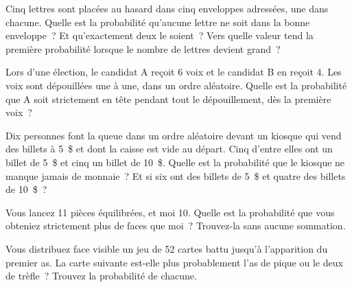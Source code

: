 \begin{question}\label{iq:iv1:counting-and-symmetry:12}
Cinq lettres sont placées au hasard dans cinq enveloppes adressées, une dans chacune. Quelle est la probabilité qu'aucune lettre ne soit dans la bonne enveloppe~? Et qu'exactement deux le soient~? Vers quelle valeur tend la première probabilité lorsque le nombre de lettres devient grand~?
\end{question}

\begin{question}\label{iq:iv1:counting-and-symmetry:13}
Lors d'une élection, le candidat A reçoit 6 voix et le candidat B en reçoit 4. Les voix sont dépouillées une à une, dans un ordre aléatoire. Quelle est la probabilité que A soit strictement en tête pendant tout le dépouillement, dès la première voix~?
\end{question}

\begin{question}\label{iq:iv1:counting-and-symmetry:14}
Dix personnes font la queue dans un ordre aléatoire devant un kiosque qui vend des billets à 5~\$ et dont la caisse est vide au départ. Cinq d'entre elles ont un billet de 5~\$ et cinq un billet de 10~\$. Quelle est la probabilité que le kiosque ne manque jamais de monnaie~? Et si six ont des billets de 5~\$ et quatre des billets de 10~\$~?
\end{question}

\begin{question}\label{iq:iv1:counting-and-symmetry:15}
Vous lancez 11 pièces équilibrées, et moi 10. Quelle est la probabilité que vous obteniez strictement plus de faces que moi~? Trouvez-la sans aucune sommation.
\end{question}

\begin{question}\label{iq:iv1:counting-and-symmetry:16}
Vous distribuez face visible un jeu de 52 cartes battu jusqu'à l'apparition du premier as. La carte suivante est-elle plus probablement l'as de pique ou le deux de trèfle~? Trouvez la probabilité de chacune.
\end{question}

